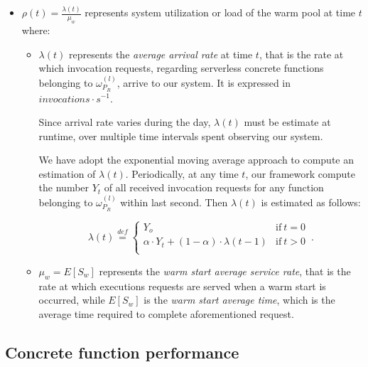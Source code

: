 \documentclass[12pt,a4paper]{report}
\newcommand{\mathDef}{\overset{\textit{def}}{=}}
\theoremstyle{definition}
\begin{document}
\begin{itemize}
	
	\item $\displaystyle \rho(t) = \frac{\lambda(t)}{\mu_{w}}$ represents system utilization or load of the warm pool at time $t$ where:
	
	\begin{itemize}
		
		\item $\lambda(t)$ represents the \textit{average arrival rate} at time $t$, that is the rate at which invocation requests, regarding serverless concrete functions belonging to $\omega_{P_R}^{(l)}$, arrive to our system. It is expressed in $invocations \cdot s^{-1}$.
				
		Since arrival rate varies during the day, $\lambda(t)$ must be estimate at runtime, over multiple time intervals spent observing our system.
		
		We have adopt the exponential moving average approach to compute an estimation of $\lambda(t)$. Periodically, at any time $t$, our framework compute the number $Y_t$ of all received invocation requests for any function belonging to $\omega_{P_R}^{(l)}$ within last second. Then $\lambda(t)$ is estimated as follows:
		
		\begin{equation}
			\lambda(t) \mathDef
			\begin{cases}
				Y_o & \text{if}\ t = 0\\ 
				\alpha \cdot Y_t + (1 - \alpha) \cdot \lambda(t-1) & \text{if}\ t > 0\\
				
			\end{cases}\,.
		\end{equation}
		
		\item $\mu_{w} = E[S_w]$ represents the \textit{warm start average service rate}, that is the rate at which executions requests are served when a warm start is occurred, while $E[S_w]$ is the \textit{warm start average time}, which is the average time required to complete aforementioned request.
		
	\end{itemize}
	
\end{itemize}


\subsection{Concrete function performance}
\end{document}
